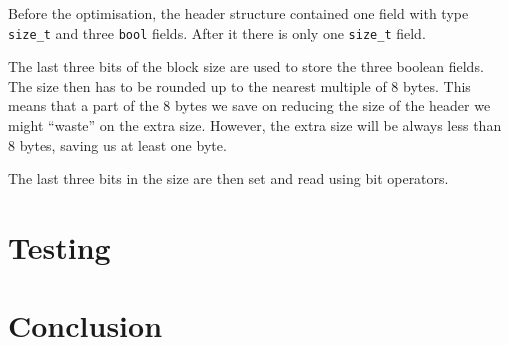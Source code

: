 \documentclass{article}
\begin{document}
Before the optimisation, the header structure contained one field with type \lstinline{size_t} and three \lstinline{bool} fields. After it there is only one \lstinline{size_t} field.

The last three bits of the block size are used to store the three boolean fields. The size then has to be rounded up to the nearest multiple of 8 bytes. This means that a part of the 8 bytes we save on reducing the size of the header we might ``waste'' on the extra size. However, the extra size will be always less than 8 bytes, saving us at least one byte.

The last three bits in the size are then set and read using bit operators.

\section{Testing}

\section{Conclusion}



\end{document}
